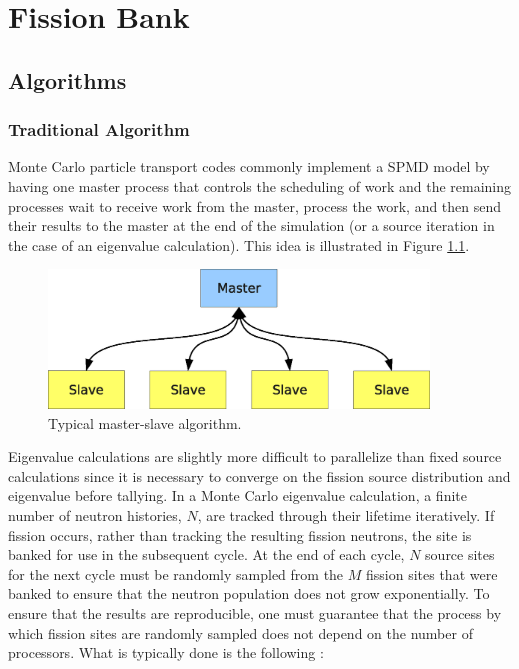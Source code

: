 \chapter{Fission Bank}

\section{Algorithms}
\label{sec:algorithms}

\subsection{Traditional Algorithm}

Monte Carlo particle transport codes commonly implement a SPMD model
by having one master process that controls the scheduling of work and
the remaining processes wait to receive work from the master, process
the work, and then send their results to the master at the end of the
simulation (or a source iteration in the case of an eigenvalue
calculation). This idea is illustrated in Figure
\ref{fig:master-slave}.
\begin{figure}[ht]
  \centering
  \includegraphics[width=0.9\textwidth]{figures/master-slave/master-slave.eps}
  \caption{Typical master-slave algorithm.}
  \label{fig:master-slave}
\end{figure}

Eigenvalue calculations are slightly more difficult to parallelize
than fixed source calculations since it is necessary to converge on
the fission source distribution and eigenvalue before tallying. In a
Monte Carlo eigenvalue calculation, a finite number of neutron
histories, $N$, are tracked through their lifetime iteratively. If
fission occurs, rather than tracking the resulting fission neutrons,
the site is banked for use in the subsequent cycle. At the end of each
cycle, $N$ source sites for the next cycle must be randomly sampled
from the $M$ fission sites that were banked to ensure that the neutron
population does not grow exponentially. To ensure that the results are
reproducible, one must guarantee that the process by which fission
sites are randomly sampled does not depend on the number of
processors. What is typically done is the following \cite{mcnp}:


